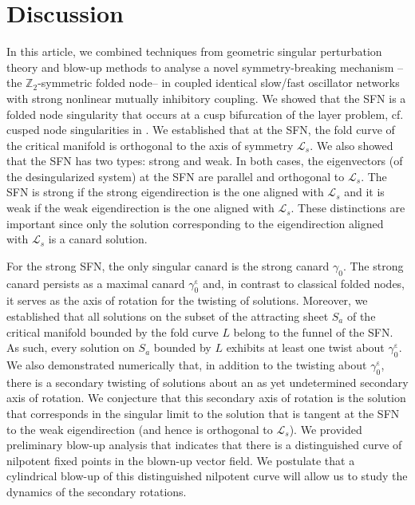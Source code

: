\documentclass[10pt,onecolumn]{article}
\theoremstyle{plain}
\DeclareMathOperator{\eps}{\varepsilon}
\begin{document}
\section{Discussion}  \label{sec:discussion}
In this article, we combined techniques from geometric singular perturbation theory and blow-up methods to analyse a novel symmetry-breaking mechanism --the $\mathbb Z_2$-symmetric folded node-- in coupled identical slow/fast oscillator networks with strong nonlinear mutually inhibitory coupling. 
We showed that the SFN is a folded node singularity that occurs at a cusp bifurcation of the layer problem, cf. cusped node singularities in  \cite{Kristiansen2023}. 
We established that at the SFN, the fold curve of the critical manifold is orthogonal to the axis of symmetry $\mathcal L_s$. 
We also showed that the SFN has two types: strong and weak. 
In both cases, the eigenvectors (of the desingularized system) at the SFN are parallel and orthogonal to $\mathcal L_s$. 
The SFN is strong if the strong eigendirection is the one aligned with $\mathcal L_s$ and it is weak if the weak eigendirection is the one aligned with $\mathcal L_s$. 
These distinctions are important since only the solution corresponding to the eigendirection aligned with $\mathcal L_s$ is a canard solution. 

For the strong SFN, the only singular canard is the strong canard $\gamma_0$.
The strong canard persists as a maximal canard $\gamma_0^{\eps}$ and, in contrast to classical folded nodes, it serves as the axis of rotation for the twisting of solutions. 
Moreover, we established that all solutions on the subset of the attracting sheet $S_a$ of the critical manifold bounded by the fold curve $L$ belong to  the funnel of the SFN. 
As such, every solution on $S_a$ bounded by $L$ exhibits at least one twist about $\gamma_0^{\eps}$.
We also demonstrated numerically that, in addition to the twisting about $\gamma_0^{\eps}$, there is a secondary twisting of solutions about an as yet undetermined secondary axis of rotation. 
We conjecture that this secondary axis of rotation is the solution that corresponds in the singular limit to the solution that is tangent at the SFN to the weak eigendirection (and hence is orthogonal to $\mathcal L_s$). 
We provided preliminary blow-up analysis that indicates that there is a distinguished curve of nilpotent fixed points in the blown-up vector field.  
We postulate that a cylindrical blow-up of this distinguished nilpotent curve will allow us to study the dynamics of the secondary rotations.
\end{document}

